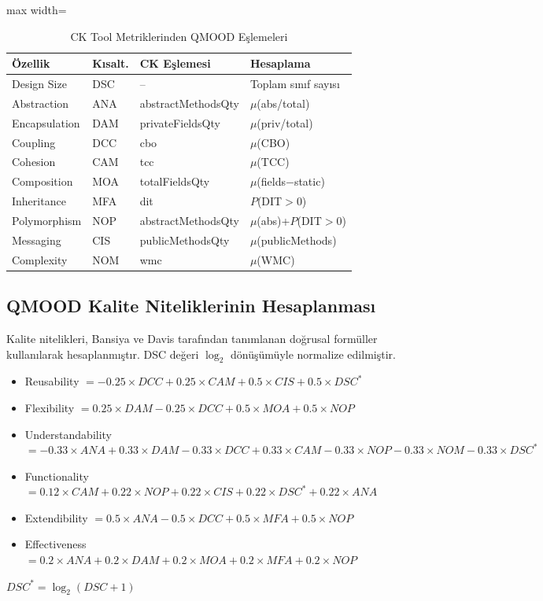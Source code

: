 \documentclass[conference]{IEEEtran}
\begin{document}
\begin{table}[htbp]
\caption{CK Tool Metriklerinden QMOOD E\c{s}lemeleri}
\label{tab:mapping}
\centering
\begin{adjustbox}{max width=\columnwidth}
\begin{tabular}{llll}
\toprule
\"Ozellik & K{\i}salt. & CK E\c{s}lemesi & Hesaplama \\
\midrule
Design Size & DSC & -- & Toplam s{\i}n{\i}f say{\i}s{\i} \\
Abstraction & ANA & abstractMethodsQty & $\mu$(abs/total) \\
Encapsulation & DAM & privateFieldsQty & $\mu$(priv/total) \\
Coupling & DCC & cbo & $\mu$(CBO) \\
Cohesion & CAM & tcc & $\mu$(TCC) \\
Composition & MOA & totalFieldsQty & $\mu$(fields$-$static) \\
Inheritance & MFA & dit & $P$(DIT$>$0) \\
Polymorphism & NOP & abstractMethodsQty & $\mu$(abs)+$P$(DIT$>$0) \\
Messaging & CIS & publicMethodsQty & $\mu$(publicMethods) \\
Complexity & NOM & wmc & $\mu$(WMC) \\
\bottomrule
\end{tabular}
\end{adjustbox}
\end{table}

\subsection{QMOOD Kalite Niteliklerinin Hesaplanmas{\i}}
Kalite nitelikleri, Bansiya ve Davis \cite{bansiya2002} taraf{\i}ndan tan{\i}mlanan do\u{g}rusal form\"uller kullan{\i}larak hesaplanm{\i}\c{s}t{\i}r. DSC de\u{g}eri $\log_2$ d\"on\"u\c{s}\"um\"uyle normalize edilmi\c{s}tir.

\begin{itemize}
\item Reusability $= -0.25 \times DCC + 0.25 \times CAM + 0.5 \times CIS + 0.5 \times DSC^*$
\item Flexibility $= 0.25 \times DAM - 0.25 \times DCC + 0.5 \times MOA + 0.5 \times NOP$
\item Understandability $= -0.33 \times ANA + 0.33 \times DAM - 0.33 \times DCC + 0.33 \times CAM - 0.33 \times NOP - 0.33 \times NOM - 0.33 \times DSC^*$
\item Functionality $= 0.12 \times CAM + 0.22 \times NOP + 0.22 \times CIS + 0.22 \times DSC^* + 0.22 \times ANA$
\item Extendibility $= 0.5 \times ANA - 0.5 \times DCC + 0.5 \times MFA + 0.5 \times NOP$
\item Effectiveness $= 0.2 \times ANA + 0.2 \times DAM + 0.2 \times MOA + 0.2 \times MFA + 0.2 \times NOP$
\end{itemize}
\noindent \textit{$DSC^* = \log_2(DSC + 1)$}
\end{document}
